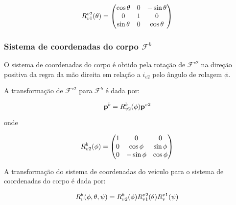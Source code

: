\documentclass[a4paper, 12pt]{article}
\begin{document}
\begin{equation}
\centering
{ R }_{ v1 }^{ v2 }(\theta) = 
\begin{pmatrix} 
	\cos {\theta}  & 0 & -\sin {\theta} \\
	0  & 1 & 0 \\
	\sin {\theta}  & 0 & \cos  {\theta}	 
\end{pmatrix}
\label{eq:rotafagem}
\end{equation}

\subsubsection{Sistema de coordenadas do corpo $\mathcal{F}^{b}$}

O sistema de coordenadas do corpo é obtido pela rotação de $\mathcal{F}^{v2}$ na direção positiva da regra da mão direita em relação a $i_{v2}$ pelo ângulo de rolagem $\phi$. 

A transformação de $\mathcal{F}^{v2}$ para $\mathcal{F}^{b}$ é dada por:

\begin{equation}
\centering
\mathbf{p}^{b} = { R }_{ v2 }^{ b }(\phi)\mathbf{p}^{v2}
\label{eq:coord3}
\end{equation}

\noindent onde

\begin{equation}
\centering
{ R }_{ v2 }^{ b }(\phi) = 
\begin{pmatrix} 
	1  & 0 & 0 \\
	0 & \cos {\phi}  &  \sin {\phi} \\
	0 & -\sin {\phi}  & \cos {\phi}	 
\end{pmatrix}
\label{eq:rotrolagem}
\end{equation}

A transformação do sistema de coordenadas do veículo para o sistema de coordenadas do corpo é dada por:

\begin{equation}
\centering
{ R }_{ v }^{ b }(\phi, \theta, \psi) = 
{ R }_{ v2 }^{ b }(\phi){ R }_{ v1 }^{ v2 }(\theta){ R }_{ v }^{ v1 }(\psi)
\label{eq:rot1}
\end{equation}
\end{document}
